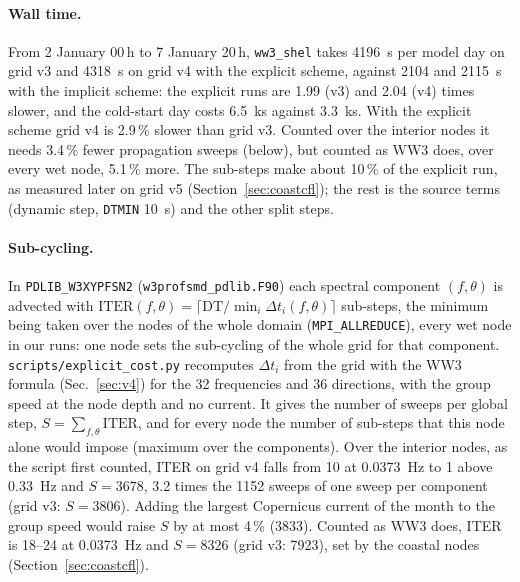 \documentclass[11pt,a4paper]{article}
\begin{document}
\paragraph{Wall time.} From 2 January 00\,h to 7 January 20\,h,
\texttt{ww3\_shel} takes \SI{4196}{s} per model day on grid v3 and
\SI{4318}{s} on grid v4 with the explicit scheme, against 2104 and
\SI{2115}{s} with the implicit scheme: the explicit runs are 1.99 (v3)
and 2.04 (v4) times slower, and the cold-start day costs \SI{6.5}{ks}
against \SI{3.3}{ks}. With the explicit scheme grid v4 is 2.9\,\% slower
than grid v3. Counted over the interior nodes it needs 3.4\,\% fewer
propagation sweeps (below), but counted as WW3 does, over every wet node,
5.1\,\% more. The sub-steps make about 10\,\% of the explicit run, as
measured later on grid v5 (Section~\ref{sec:coastcfl}); the rest is the
source terms (dynamic step, \texttt{DTMIN} \SI{10}{s}) and the other
split steps.

\paragraph{Sub-cycling.} In \texttt{PDLIB\_W3XYPFSN2}
(\texttt{w3profsmd\_pdlib.F90}) each spectral component $(f,\theta)$ is
advected with $\mathrm{ITER}(f,\theta)=\lceil\mathrm{DT}/\min_i\Delta
t_i(f,\theta)\rceil$ sub-steps, the minimum being taken over the nodes of
the whole domain (\texttt{MPI\_ALLREDUCE}), every wet node in our runs:
one node sets the sub-cycling of the whole grid for that component.
\texttt{scripts/explicit\_cost.py} recomputes $\Delta t_i$ from the grid
with the WW3 formula (Sec.~\ref{sec:v4}) for the 32 frequencies and 36
directions, with the group speed at the node depth and no current. It
gives the number of sweeps per global step,
$S=\sum_{f,\theta}\mathrm{ITER}$, and for every node the number of
sub-steps that this node alone would impose (maximum over the
components). Over the interior nodes, as the script first counted, ITER
on grid v4 falls from 10 at \SI{0.0373}{Hz} to 1 above \SI{0.33}{Hz} and
$S=3678$, 3.2 times the 1152 sweeps of one sweep per component (grid v3:
$S=3806$). Adding the largest Copernicus current of the month to the
group speed would raise $S$ by at most 4\,\% (3833). Counted as WW3 does,
ITER is 18--24 at \SI{0.0373}{Hz} and $S=8326$ (grid v3: 7923), set by
the coastal nodes (Section~\ref{sec:coastcfl}).
\end{document}
